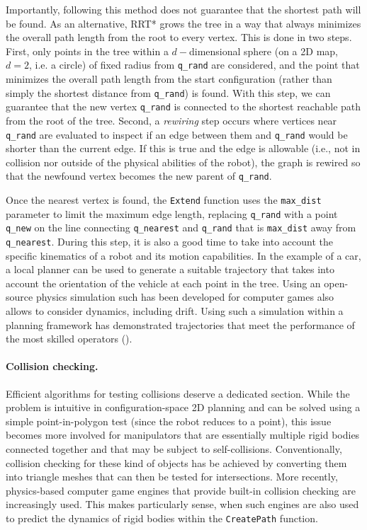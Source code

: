 Importantly, following this method does not guarantee that the shortest path will be found.
As an alternative, RRT* grows the tree in a way that always minimizes the overall path length from the root to every vertex.
This is done in two steps.
First, only points in the tree within a $d-$dimensional sphere (on a 2D map, $d=2$, i.e. a circle) of fixed radius from \texttt{q\_rand} are considered, and the point that minimizes the overall path length from the start configuration (rather than simply the shortest distance from \texttt{q\_rand}) is found. With this step, we can guarantee that the new vertex \texttt{q\_rand} is connected to the shortest reachable path from the root of the tree.
Second, a \textsl{rewiring} step occurs where vertices near \texttt{q\_rand} are evaluated to inspect if an edge between them and \texttt{q\_rand} would be shorter than the current edge. If this is true and the edge is allowable (i.e., not in collision nor outside of the physical abilities of the robot), the graph is rewired so that the newfound vertex becomes the new parent of \texttt{q\_rand}.

Once the nearest vertex is found, the \texttt{Extend} function uses the \texttt{max\_dist} parameter to limit the maximum edge length, replacing \texttt{q\_rand} with a point \texttt{q\_new} on the line connecting \texttt{q\_nearest} and \texttt{q\_rand} that is \texttt{max\_dist} away from \texttt{q\_nearest}.
%
During this step, it is also a good time to take into account the specific kinematics of a robot and its motion capabilities. In the example of a car, a local planner can be used to generate a suitable trajectory that takes into account the orientation of the vehicle at each point in the tree. Using an open-source physics simulation such has been developed for computer games also allows to consider dynamics, including drift. Using such a simulation within a planning framework has demonstrated trajectories that meet the performance of the most skilled operators (\cite{keivan2013realtime}).



\paragraph{Collision checking.}

Efficient algorithms for testing collisions deserve a dedicated section. While the problem is intuitive in configuration-space 2D planning and can be solved using a simple point-in-polygon test (since the robot reduces to a point), this issue becomes more involved for manipulators that are essentially multiple rigid bodies connected together and that may be subject to self-collisions. Conventionally, collision checking for these kind of objects has be achieved by converting them into triangle meshes that can then be tested for intersections. More recently,  physics-based computer game engines that provide built-in collision checking are increasingly used. This makes particularly sense, when such engines are also used to predict the dynamics of rigid bodies within the \texttt{CreatePath} function.  


